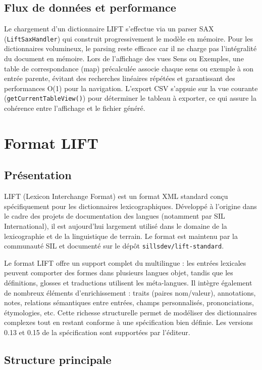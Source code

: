 \documentclass[11pt,twoside,openany]{book}
\begin{document}
\section{Flux de données et performance}

Le chargement d'un dictionnaire LIFT s'effectue via un parser SAX (\texttt{LiftSaxHandler}) qui construit progressivement le modèle en mémoire. Pour les dictionnaires volumineux, le parsing reste efficace car il ne charge pas l'intégralité du document en mémoire. Lors de l'affichage des vues Sens ou Exemples, une table de correspondance (map) précalculée associe chaque sens ou exemple à son entrée parente, évitant des recherches linéaires répétées et garantissant des performances O(1) pour la navigation. L'export CSV s'appuie sur la vue courante (\texttt{getCurrentTableView()}) pour déterminer le tableau à exporter, ce qui assure la cohérence entre l'affichage et le fichier généré.


\chapter{Format LIFT}

\section{Présentation}

LIFT (Lexicon Interchange Format) est un format XML standard conçu spécifiquement pour les dictionnaires lexicographiques. Développé à l'origine dans le cadre des projets de documentation des langues (notamment par SIL International), il est aujourd'hui largement utilisé dans le domaine de la lexicographie et de la linguistique de terrain. Le format est maintenu par la communauté SIL et documenté sur le dépôt \texttt{sillsdev/lift-standard}.

Le format LIFT offre un support complet du multilingue : les entrées lexicales peuvent comporter des formes dans plusieurs langues objet, tandis que les définitions, glosses et traductions utilisent les méta-langues. Il intègre également de nombreux éléments d'enrichissement : traits (paires nom/valeur), annotations, notes, relations sémantiques entre entrées, champs personnalisés, prononciations, étymologies, etc. Cette richesse structurelle permet de modéliser des dictionnaires complexes tout en restant conforme à une spécification bien définie. Les versions 0.13 et 0.15 de la spécification sont supportées par l'éditeur.

\section{Structure principale}
\end{document}
